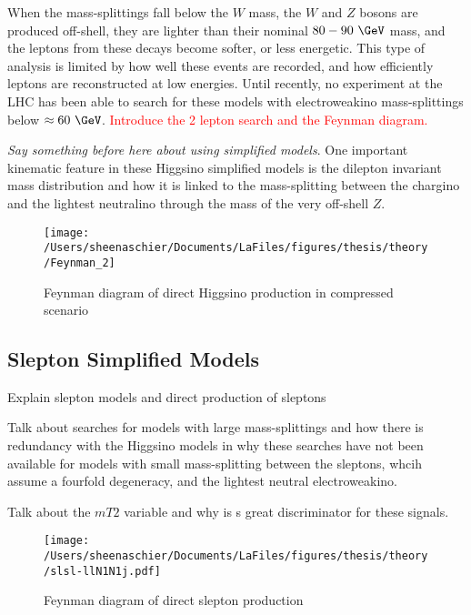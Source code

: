 When the mass-splittings fall below the $W$ mass, the $W$ and $Z$ bosons are produced off-shell, they are lighter than their nominal $80-90~\GeV$ mass, and the leptons from these decays become softer, or less energetic.  This type of analysis is limited by how well these events are recorded, and how efficiently leptons are reconstructed at low energies.  Until recently, no experiment at the LHC has been able to search for these models with electroweakino mass-splittings below $\approx 60~\GeV$.  \textcolor{red}{Introduce the 2 lepton search and the Feynman diagram.}

\textit{Say something before here about using simplified models}.
One important kinematic feature in these Higgsino simplified models is the dilepton invariant mass distribution and how it is linked to the mass-splitting between the chargino and the lightest neutralino through the mass of the very off-shell $Z$.

 \begin{figure}%
  \begin{center}
  \texttt{[image: /Users/sheenaschier/Documents/LaFiles/figures/thesis/theory/Feynman\_2]}
   \end{center}
 \caption{Feynman diagram of direct Higgsino production in compressed scenario}
 \label{fig:fn1}
 \end{figure}
 
 \subsection{Slepton Simplified Models}
 Explain slepton models and direct production of sleptons
 
 Talk about searches for models with large mass-splittings and how there is redundancy with the Higgsino models in why these searches have not been available for models with small mass-splitting between the sleptons, whcih assume a fourfold degeneracy, and the lightest neutral electroweakino.
 
 Talk about the $m{T2}$ variable and why is s great discriminator for these signals.
 
  \begin{figure}%
  \begin{center}
  \texttt{[image: /Users/sheenaschier/Documents/LaFiles/figures/thesis/theory/slsl-llN1N1j.pdf]}
   \end{center}
 \caption{Feynman diagram of direct slepton production}
 \label{fig:fn1}
 \end{figure}